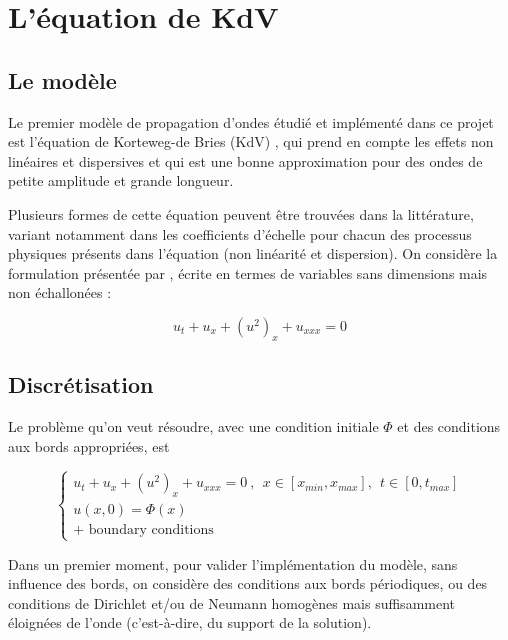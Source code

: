\section{L'équation de KdV}
\label{sec:KdV}

\subsection{Le modèle}

\indent Le premier modèle de propagation d'ondes étudié et implémenté dans ce projet est l'équation de Korteweg-de Bries (KdV) , qui prend en compte les effets non linéaires et dispersives et qui est une bonne approximation pour des ondes de petite amplitude et grande longueur. \cite{BBM1971}

 \indent Plusieurs formes de cette équation peuvent être trouvées dans la littérature, variant notamment dans les coefficients d'échelle pour chacun des processus physiques présents dans l'équation (non linéarité et dispersion). On considère la formulation présentée par \cite{BBM1971}, écrite en termes de variables sans dimensions mais non échallonées : 

\begin{equation*}
    u_t + u_x + (u^2)_x + u_{xxx} = 0
\end{equation*}

\subsection{Discrétisation}

\indent Le problème qu'on veut résoudre, avec une condition initiale $\Phi$ et des conditions aux bords appropriées, est

\begin{equation*}
\begin{cases}
    u_t + u_x + (u^2)_x + u_{xxx} = 0 \ , \ \ x \in [x_{min},x_{max}], \ \ t \in [0, t_{max}] \\
    u(x,0) = \Phi(x) \\
    \text{+ boundary conditions}
\end{cases}
\end{equation*}

\indent Dans un premier moment, pour valider l'implémentation du modèle, sans influence des bords, on considère des conditions aux bords périodiques, ou des conditions de Dirichlet et/ou de Neumann homogènes mais suffisamment éloignées de l'onde (c'est-à-dire, du support de la solution).


